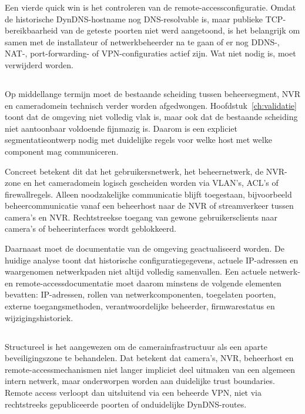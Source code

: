Een vierde quick win is het controleren van de remote-accessconfiguratie. Omdat de historische DynDNS-hostname nog DNS-resolvable is, maar publieke TCP-bereikbaarheid van de geteste poorten niet werd aangetoond, is het belangrijk om samen met de installateur of netwerkbeheerder na te gaan of er nog DDNS-, NAT-, port-forwarding- of VPN-configuraties actief zijn. Wat niet nodig is, moet verwijderd worden.

\subsection{}%
\label{subsec:middellangetermijn}

Op middellange termijn moet de bestaande scheiding tussen beheersegment, NVR en cameradomein technisch verder worden afgedwongen. Hoofdstuk~\ref{ch:validatie} toont dat de omgeving niet volledig vlak is, maar ook dat de bestaande scheiding niet aantoonbaar voldoende fijnmazig is. Daarom is een expliciet segmentatieontwerp nodig met duidelijke regels voor welke host met welke component mag communiceren.

Concreet betekent dit dat het gebruikersnetwerk, het beheernetwerk, de NVR-zone en het cameradomein logisch gescheiden worden via VLAN's, ACL's of firewallregels. Alleen noodzakelijke communicatie blijft toegestaan, bijvoorbeeld beheercommunicatie vanaf een beheerhost naar de NVR of streamverkeer tussen camera's en NVR. Rechtstreekse toegang van gewone gebruikersclients naar camera's of beheerinterfaces wordt geblokkeerd.

Daarnaast moet de documentatie van de omgeving geactualiseerd worden. De huidige analyse toont dat historische configuratiegegevens, actuele IP-adressen en waargenomen netwerkpaden niet altijd volledig samenvallen. Een actuele netwerk- en remote-accessdocumentatie moet daarom minstens de volgende elementen bevatten: IP-adressen, rollen van netwerkcomponenten, toegelaten poorten, externe toegangsmethoden, verantwoordelijke beheerder, firmwarestatus en wijzigingshistoriek.

\subsection{}%
\label{subsec:structurele-maatregelen}

Structureel is het aangewezen om de camerainfrastructuur als een aparte beveiligingszone te behandelen. Dat betekent dat camera's, NVR, beheerhost en remote-accessmechanismen niet langer impliciet deel uitmaken van een algemeen intern netwerk, maar onderworpen worden aan duidelijke trust boundaries. Remote access verloopt dan uitsluitend via een beheerde VPN, niet via rechtstreeks gepubliceerde poorten of onduidelijke DynDNS-routes.

